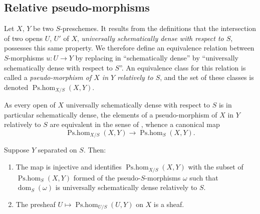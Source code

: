 \subsection{Relative pseudo-morphisms}
\label{IV.20.5}

\begin{env}[20.5.1]
\label{IV.20.5.1}
Let $X$, $Y$ be two $S$-preschemes.
It results from the definitions  that the intersection of two opens $U$, $U'$ of $X$, \emph{universally schematically dense with respect to $S$}, possesses this same property.
We therefore define an equivalence relation between $S$-morphisms $u:U\to Y$ by replacing in  ``schematically dense'' by ``universally schematically dense with respect to $S$''.
An equivalence class for this relation is called a \emph{pseudo-morphism of $X$ in $Y$ relatively to $S$}, and the set of these classes is denoted $\operatorname{Ps.hom}_{X/S}(X,Y)$.
\end{env}

\begin{env}[20.5.2]
\label{IV.20.5.2}
As every open of $X$ universally schematically dense with respect to $S$ is in particular schematically dense, the elements of a pseudo-morphism of $X$ in $Y$ relatively to $S$ are equivalent in the sense of , whence a canonical map
\[
\label{IV.20.5.2.1}
  \operatorname{Ps.hom}_{X/S}(X,Y)\to\operatorname{Ps.hom}_S(X,Y).
  \tag{20.5.2.1}
\]
\end{env}

\begin{proposition}[20.5.3]
\label{IV.20.5.3}
Suppose $Y$ separated on $S$.
Then:
\begin{enumerate}[label=\emph{(\roman*)}]
  \item The map  is injective and identifies $\operatorname{Ps.hom}_{X/S}(X,Y)$ with the subset of $\operatorname{Ps.hom}_S(X,Y)$ formed of the pseudo-$S$-morphisms $\omega$ such that $\operatorname{dom}_S(\omega)$ is universally schematically dense relatively to $S$.
  \item The presheaf $U\mapsto\operatorname{Ps.hom}_{U/S}(U,Y)$ on $X$ is a sheaf.
\end{enumerate}
\end{proposition}

